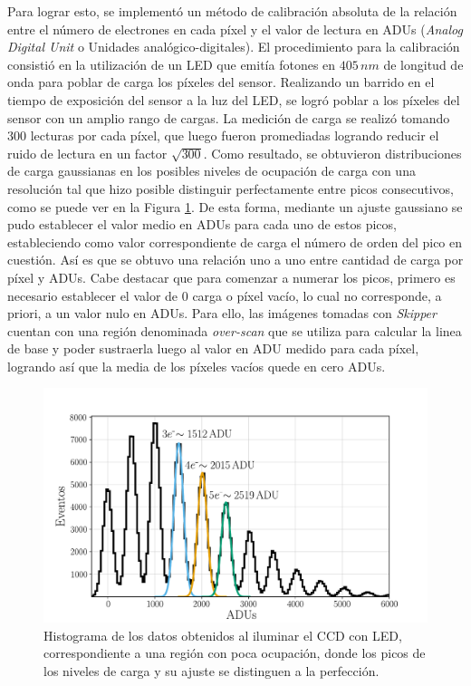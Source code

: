 Para lograr esto, se implementó un método de calibración absoluta de la relación entre el número de electrones en cada píxel y el valor de lectura en ADUs (\textit{Analog Digital Unit} o Unidades analógico-digitales). El procedimiento para la calibración consistió en la utilización de un LED que emitía fotones en $405\,\si{nm}$ de longitud de onda para poblar de carga los píxeles del sensor. 
Realizando un barrido en el tiempo de exposición del sensor a la luz del LED, se logró poblar a los píxeles del sensor con un amplio rango de cargas. La medición de carga se realizó tomando $300$ lecturas por cada píxel, que luego fueron promediadas logrando reducir el ruido de lectura en un factor $\sqrt{300}$. 
Como resultado, se obtuvieron distribuciones de carga gaussianas en los posibles niveles de ocupación de carga con una resolución tal que hizo posible distinguir perfectamente entre picos consecutivos, como se puede ver en la Figura \ref{fig:Calibracion}. 
De esta forma, mediante un ajuste gaussiano se pudo establecer el valor medio en ADUs para cada uno de estos picos, estableciendo como valor correspondiente de carga el número de orden del pico en cuestión. 
Así es que se obtuvo una relación uno a uno entre cantidad de carga por píxel y ADUs. Cabe destacar que para comenzar a numerar los picos, primero es necesario establecer el valor de $0$ carga o píxel vacío, lo cual no corresponde, a priori, a un valor nulo en ADUs. 
Para ello, las imágenes tomadas con \textit{Skipper} cuentan con una región denominada \textit{over-scan} que se utiliza para calcular la linea de base y poder sustraerla luego al valor en ADU medido para cada píxel, logrando así que la media de los píxeles vacíos quede en cero ADUs.
\begin{figure}[H]
    \centering
        \includegraphics[scale=0.5]{Figs/ajuste_gaussiano_calibracion.pdf}
    \caption{Histograma de los datos obtenidos al iluminar el CCD con LED, correspondiente a una región con poca ocupación, donde los picos de los niveles de carga y su ajuste se distinguen a la perfección.}
    \label{fig:Calibracion}
\end{figure}
